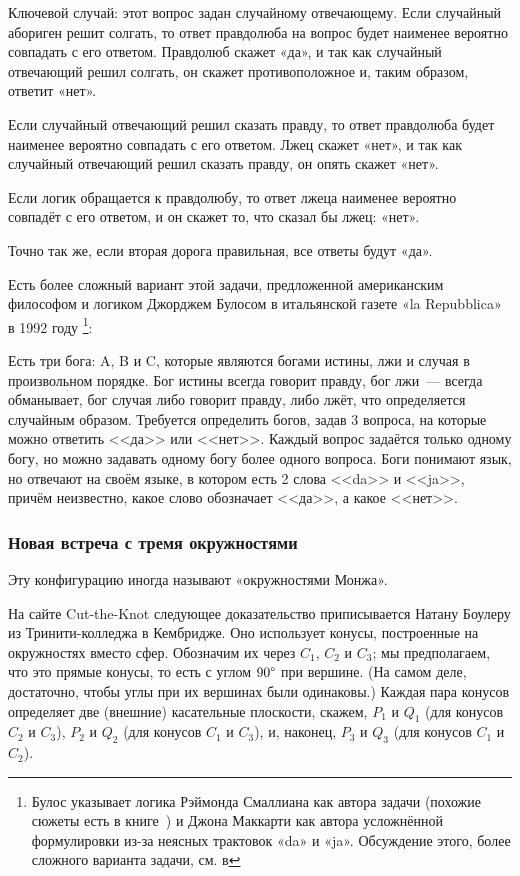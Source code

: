 Ключевой случай: этот вопрос задан случайному отвечающему.
Если случайный абориген решит солгать, то ответ правдолюба на вопрос будет наименее вероятно совпадать с его ответом.
Правдолюб скажет «да», и так как случайный отвечающий решил солгать, он скажет противоположное и, таким образом, ответит «нет».

Если случайный отвечающий решил сказать правду, то ответ правдолюба будет наименее вероятно совпадать с его ответом.
Лжец скажет «нет», и так как случайный отвечающий решил сказать правду, он опять скажет «нет».

Если логик обращается к правдолюбу, то ответ лжеца наименее вероятно совпадёт с его ответом, и он скажет то, что сказал бы лжец: «нет».

Точно так же, если вторая дорога правильная, все ответы будут «да».

\begin{addedbytheeditors}
Есть более сложный вариант этой задачи, предложенной американским философом и логиком Джорджем Булосом в итальянской газете «la Repubblica» в 1992 году%
\footnote{Булос указывает логика Рэймонда Смаллиана как автора задачи (похожие сюжеты есть в книге~\cite{52}) и Джона Маккарти как автора усложнённой формулировки из-за неясных трактовок «da» и «ja».
Обсуждение этого, более сложного варианта задачи, см. в
}:

Есть три бога: A, B и C, которые являются богами истины, лжи и случая в произвольном порядке.
Бог истины всегда говорит правду, бог лжи~--- всегда обманывает, бог случая либо говорит правду, либо лжёт, что определяется случайным образом. Требуется определить богов, задав 3 вопроса, на которые можно ответить <<да>> или <<нет>>. Каждый вопрос задаётся только одному богу, но можно задавать одному богу более одного вопроса. Боги понимают язык, но отвечают на своём языке, в котором есть 2 слова <<da>> и <<ja>>, причём неизвестно, какое слово обозначает <<да>>, а какое <<нет>>.\pr
\end{addedbytheeditors}

\subsubsection*{Новая встреча с тремя окружностями}

Эту конфигурацию иногда называют «окружностями Монжа».

На сайте Cut-the-Knot \cite{cut-the-knot} следующее доказательство приписывается Натану Боулеру из Тринити-колледжа в Кембридже.
Оно использует конусы, построенные на окружностях вместо сфер.
Обозначим их через $C_1$, $C_2$ и $C_3$; мы предполагаем, что это прямые конусы, то есть с углом $90\degree$ при вершине.
(На самом деле, достаточно, чтобы углы при их вершинах были одинаковы.)
Каждая пара конусов определяет две (внешние) касательные плоскости, скажем, $P_1$ и $Q_1$ (для конусов $C_2$ и $C_3$), $P_2$ и $Q_2$ (для конусов $C_1$ и $C_3$), и, наконец, $P_3$ и $Q_3$ (для конусов $C_1$ и $C_2$).

